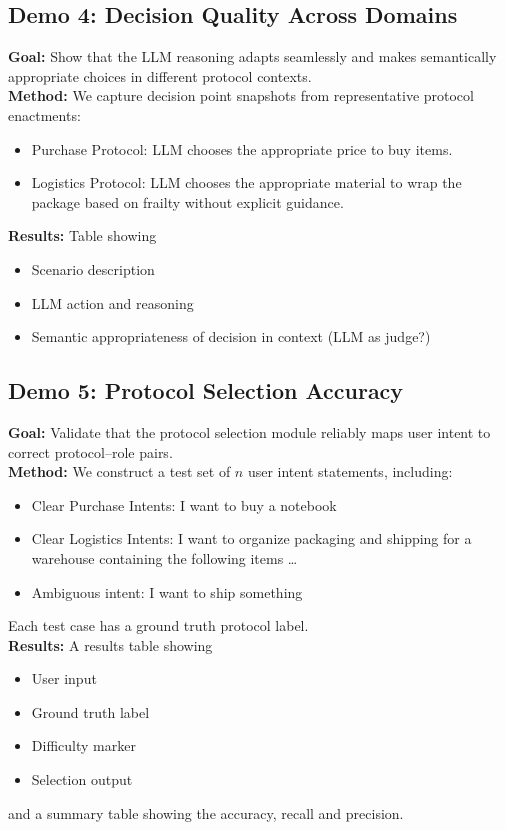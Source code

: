 \documentclass[runningheads]{llncs}
\begin{document}
\subsection{Demo 4: Decision Quality Across Domains}
\textbf{Goal:} Show that the LLM reasoning adapts seamlessly and makes semantically appropriate choices in different protocol contexts.\\
\textbf{Method:} We capture decision point snapshots from representative protocol enactments:
\begin{itemize}
    \item Purchase Protocol: LLM chooses the appropriate price to buy items.
    \item Logistics Protocol: LLM chooses the appropriate material to wrap the package based on frailty without explicit guidance.
\end{itemize}
\textbf{Results:} Table showing
\begin{itemize}
    \item Scenario description
    \item LLM action and reasoning
    \item Semantic appropriateness of decision in context (LLM as judge?)
\end{itemize}

\subsection{Demo 5: Protocol Selection Accuracy}
\textbf{Goal:} Validate that the protocol selection module reliably maps user intent to correct protocol--role pairs.\\
\textbf{Method:} We construct a test set of $n$ user intent statements, including:
\begin{itemize}
    \item Clear Purchase Intents: I want to buy a notebook
    \item Clear Logistics Intents: I want to organize packaging and shipping for a warehouse containing the following items \ldots
    \item Ambiguous intent: I want to ship something
\end{itemize}
Each test case has a ground truth protocol label.\\
\textbf{Results:} A results table showing 
\begin{itemize}
    \item User input
    \item Ground truth label
    \item Difficulty marker
    \item Selection output
\end{itemize}
and a summary table showing the accuracy, recall and precision.
\end{document}
